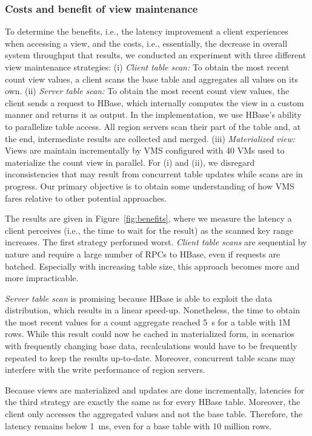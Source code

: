 \subsubsection{Costs and benefit of view maintenance} 

To determine the
benefits, i.e., the latency improvement a client experiences when
accessing a view, and the costs, i.e., essentially, the decrease in
overall system throughput that results, we conducted an experiment
with three different view maintenance strategies: (i) \textit{Client
  table scan:} To obtain the most recent count view values, a client
scans the base table and aggregates all values on its own. (ii)
\textit{Server table scan:} To obtain the most recent count view
values, the client sends a request to HBase, which internally computes
the view in a custom manner and returns it as output. In the
implementation, we use HBase's ability to parallelize table access.
All region servers scan their part of the table and, at the end,
intermediate results are collected and merged.  (iii)
\textit{Materialized view:} Views are maintain incrementally by VMS
configured with 40 VMs used to materialize the count view in parallel.
For (i) and (ii), we disregard inconsistencies that may result from
concurrent table updates while scans are in progress. Our primary
objective is to obtain some understanding of how VMS fares relative to
other potential approaches.

The results are given in Figure~\ref{fig:benefits}, where we measure
the latency a client perceives (i.e., the time to wait for the result)
as the scanned key range increases.  The first strategy performed
worst. \textit{Client table scans} are sequential by nature and
require a large number of RPCs to HBase, even if requests are
batched. Especially with increasing table size, this approach becomes
more and more impracticable.

\textit{Server table scan} is promising because HBase is able to
exploit the data distribution, which results in a linear speed-up.
Nonetheless, the time to obtain the most recent values for a count
aggregate reached 5~s for a table with 1M rows.  While this result
could now be cached in materialized form, in scenarios with frequently
changing base data, recalculations would have to be frequently
repeated to keep the results up-to-date. Moreover, concurrent table
scans may interfere with the write performance of region servers.

Because views are materialized and updates are done incrementally,
latencies for the third strategy are exactly the same as for every
HBase table. Moreover, the client only accesses the aggregated values
and not the base table. Therefore, the latency remains below 1~ms,
even for a base table with 10 million rows.

